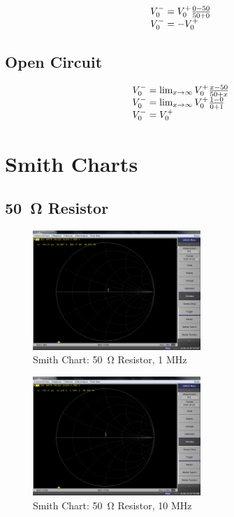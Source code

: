 \documentclass[conference]{IEEEtran}
\begin{document}
\begin{equation}{\label{eq:v_reflected_short}}
  \begin{array}{ll}
    V_0^- = V_0^+ \frac{0 - 50}{50 + 0} \\
    V_0^- = -V_0^+ \\
  \end{array}
\end{equation}

\subsection{Open Circuit}

\begin{equation}{\label{eq:v_reflected_open}}
  \begin{array}{ll}
    V_0^- = \lim_{x \to \infty} V_0^+ \frac{x - 50}{50 + x} \\
    V_0^- = \lim_{x \to \infty} V_0^+ \frac{1 - 0}{0 + 1} \\
    V_0^- = V_0^+ \\
  \end{array}
\end{equation}

\section{Smith Charts}

\subsection{\SI{50}{\ohm} Resistor}

\begin{figure}[H]
  \centering
  \includegraphics[width=2.5in]{./img/smith_50_ohms_1_MHz.png}
  \caption{Smith Chart: \SI{50}{\ohm} Resistor, 1 MHz}
  \label{fig:smith_50_ohms_1_MHz}
\end{figure}

\begin{figure}[H]
  \centering
  \includegraphics[width=2.5in]{./img/smith_50_ohms_10_MHz.png}
  \caption{Smith Chart: \SI{50}{\ohm} Resistor, 10 MHz}
  \label{fig:smith_50_ohms_10_MHz}
\end{figure}
\end{document}
